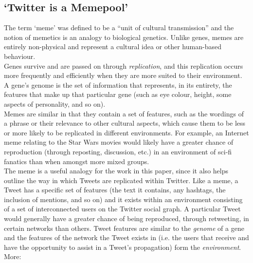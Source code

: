 \subsection{`Twitter is a Memepool'}
The term `meme' was defined to be a ``unit of cultural transmission'' \cite{dawkins76} and the notion of memetics is an analogy to biological genetics. Unlike genes, memes are entirely non-physical and represent a cultural idea or other human-based behaviour. \\
Genes survive and are passed on through \textit{replication}, and this replication occurs more frequently and efficiently when they are more suited to their environment. A gene's genome is the set of information that represents, in its entirety, the features that make up that particular gene (such as eye colour, height, some aspects of personality, and so on).\\
Memes are similar in that they contain a set of features, such as the wordings of a phrase or their relevance to other cultural aspects, which cause them to be less or more likely to be replicated in different environments. For example, an Internet meme relating to the Star Wars movies would likely have a greater chance of reproduction (through reposting, discussion, etc.) in an environment of sci-fi fanatics than when amongst more mixed groups.\\
The meme is a useful analogy for the work in this paper, since it also helps outline the way in which Tweets are replicated within Twitter. Like a meme, a Tweet has a specific set of features (the text it contains, any hashtags, the inclusion of mentions, and so on) and it exists within an environment consisting of a set of interconnected users on the Twitter social graph. A particular Tweet would generally have a greater chance of being reproduced, through retweeting, in certain networks than others. Tweet features are similar to the \textit{genome} of a gene and the features of the network the Tweet exists in (i.e. the users that receive and have the opportunity to assist in a Tweet's propagation) form the \textit{environment}.
\\ 
More:
